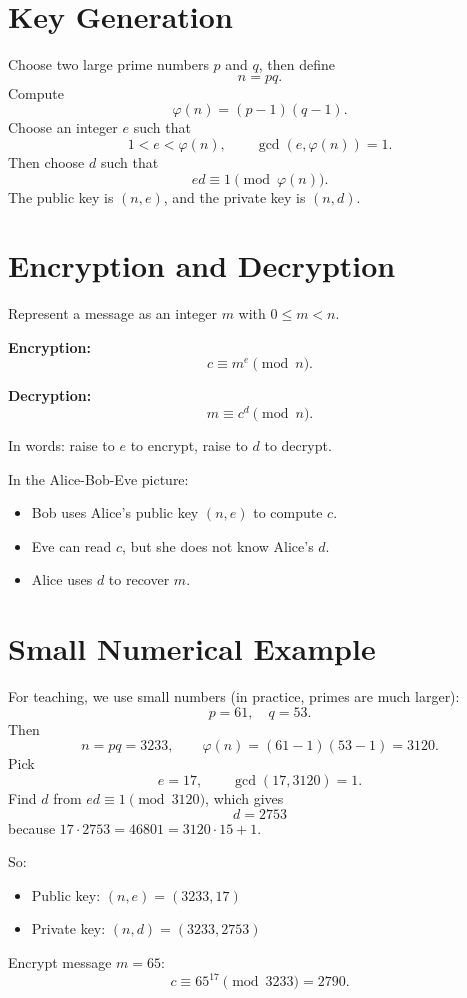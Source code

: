 \section{Key Generation}
Choose two large prime numbers \(p\) and \(q\), then define
\[
  n = pq.
\]
Compute
\[
  \varphi(n) = (p-1)(q-1).
\]
Choose an integer \(e\) such that
\[
  1 < e < \varphi(n), \qquad \gcd(e,\varphi(n))=1.
\]
Then choose \(d\) such that
\[
  ed \equiv 1 \pmod{\varphi(n)}.
\]
The public key is \((n,e)\), and the private key is \((n,d)\).

\section{Encryption and Decryption}
Represent a message as an integer \(m\) with \(0 \le m < n\).

\textbf{Encryption:}
\[
  c \equiv m^e \pmod n.
\]

\textbf{Decryption:}
\[
  m \equiv c^d \pmod n.
\]

In words: raise to \(e\) to encrypt, raise to \(d\) to decrypt.

In the Alice-Bob-Eve picture:
\begin{itemize}
  \item Bob uses Alice's public key \((n,e)\) to compute \(c\).
  \item Eve can read \(c\), but she does not know Alice's \(d\).
  \item Alice uses \(d\) to recover \(m\).
\end{itemize}

\section{Small Numerical Example}
For teaching, we use small numbers (in practice, primes are much larger):
\[
  p=61,\quad q=53.
\]
Then
\[
  n = pq = 3233,\qquad \varphi(n)=(61-1)(53-1)=3120.
\]
Pick
\[
  e=17,\qquad \gcd(17,3120)=1.
\]
Find \(d\) from \(ed\equiv 1 \pmod{3120}\), which gives
\[
  d=2753
\]
because \(17\cdot 2753 = 46801 = 3120\cdot 15 + 1\).

So:
\begin{itemize}
  \item Public key: \((n,e)=(3233,17)\)
  \item Private key: \((n,d)=(3233,2753)\)
\end{itemize}

Encrypt message \(m=65\):
\[
  c \equiv 65^{17} \pmod{3233} = 2790.
\]

